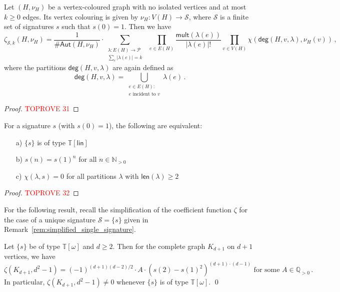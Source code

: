 \documentclass[authorcolumns,numberwithinsect]{no-lipics-v2022}
\begin{document}
\begin{theorem}\label{thm:general_coefficient}
Let $(H, \nu_H)$ be a vertex-coloured graph with no isolated vertices and at most $k \geq 0$ edges. Its vertex colouring is given by $\nu_H : V(H) \to \mathcal{S}$, where $\mathcal{S}$ is a finite set of signatures $s$ such that $s(0) = 1$. Then we have
\begin{equation} \label{eqn:Theorem_general}
    \zeta_{\mathcal{S},k}(H,\nu_H)=\frac{1}{\#\mathsf{Aut}(H, \nu_H)} \cdot \sum_{\substack{\lambda: E(H) \to \mathcal{P}\\\sum_e |\lambda(e)| = k }}\ \  \prod_{e \in E(H)} \frac{\mathsf{mult}(\lambda(e))}{|\lambda(e)|!}  \prod_{v \in V(H)} \chi(\mathsf{deg}(H, v, \lambda), \nu_H(v))\,,
\end{equation}
where the partitions $\mathsf{deg}(H, v, \lambda)$ are again defined as
\[
\mathsf{deg}(H, v, \lambda) = \bigcup_{\substack{e \in E(H):\\ e \text{ incident to }v}} \lambda(e)\,. 
\]    
\end{theorem}
\begin{proof}\textcolor{red}{TOPROVE 31}\end{proof}


\begin{lemma}\label{lem:linear_type_sigs_equivalence}

For a signature $s$ (with $s(0)=1$), the following are equivalent:
\begin{enumerate}
    \item[a)] $\{s\}$ is of type $\mathbb{T}[\mathsf{lin}]$
    \item[b)] $s(n) = s(1)^n$ for all $n\in \mathbb{N}_{>0}$
    \item[c)] $\chi(\lambda, s)=0$ for all partitions $\lambda$ with $\mathsf{len}(\lambda) \geq 2$
\end{enumerate}
\end{lemma}
\begin{proof}\textcolor{red}{TOPROVE 32}\end{proof}

For the following result, recall the simplification of the coefficient function $\zeta$ for the case of a unique signature $\mathcal{S}=\{s\}$ given in Remark~\ref{rem:simplified_single_signature}.
\begin{theorem} \label{Thm:Conj_2_false}
Let $\{s\}$ be of type $\mathbb{T}[\omega]$ and $d \geq 2$. Then for the complete graph $K_{d+1}$ on $d+1$ vertices, we have
\begin{equation} \label{eqn:zeta_complete_graph}
\zeta(K_{d+1}, d^2-1) = (-1)^{(d+1)(d-2)/2} \cdot A \cdot (s(2)-s(1)^2)^{(d+1)\cdot(d-1)} \text{ for some } A \in \mathbb{Q}_{>0}\,.
\end{equation}
In particular, $\zeta(K_{d+1}, d^2-1) \neq 0$ whenever $\{s\}$ is  of type $\mathbb{T}[\mathsf{\omega}]$. \qed
\end{theorem}
\end{document}
